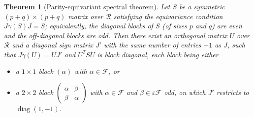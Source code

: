 \documentclass[12pt, a4paper]{report}
\theoremstyle{plain}
\newtheorem{theorem}{Theorem}[chapter]
\theoremstyle{definition}
\theoremstyle{remark}
\theoremstyle{plain}
\DeclareMathOperator{\diag}{diag}
\begin{document}
\begin{theorem}[Parity-equivariant spectral theorem]\label{thm:parity}
Let $S$ be a symmetric $(p+q)\times(p+q)$ matrix over $\mathcal R$ satisfying the equivariance condition $J\gamma(S)J=S$; equivalently, the diagonal blocks of $S$ (of sizes $p$ and $q$) are even and the off-diagonal blocks are odd. Then there exist an orthogonal matrix $U$ over $\mathcal R$ and a diagonal sign matrix $J'$ with the same number of entries $+1$ as $J$, such that $J\gamma(U)=UJ'$ and $U^TSU$ is block diagonal, each block being either
\begin{itemize}
  \item a $1\times1$ block $(\alpha)$ with $\alpha\in\mathcal F$, or
  \item a $2\times2$ block $\begin{pmatrix}\alpha&\beta\\ \beta&\alpha\end{pmatrix}$ with $\alpha\in\mathcal F$ and $\beta\in\varepsilon\mathcal F$ odd, on which $J'$ restricts to $\diag(1,-1)$.
\end{itemize}
\end{theorem}
\end{document}
